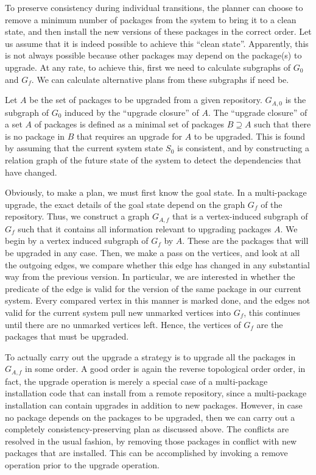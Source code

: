 \documentclass[a4paper,11pt]{article}
\begin{document}
To preserve consistency during individual transitions, the planner can
choose to remove a minimum number of packages from the system to bring
it to a clean state, and then install the new versions of these
packages in the correct order. Let us assume that it is indeed
possible to achieve this ``clean state''. Apparently, this is not
always possible because other packages may depend on the package(s) to
upgrade. At any rate, to achieve this, first we need to
calculate subgraphs of $G_0$ and $G_f$. We can calculate alternative
plans from these subgraphs if need be.

Let $A$ be the set of packages to be upgraded from a given repository.
$G_{A,0}$ is the subgraph of $G_{0}$ induced by the ``upgrade
closure'' of $A$. The ``upgrade closure'' of a set $A$ of packages is
defined as a minimal set of packages $B \supseteq A$ such that there is no
package in $B$ that requires an upgrade for $A$ to be upgraded. This
is found by assuming that the current system state $S_0$ is
consistent, and by constructing a relation graph of the future state
of the system to detect the dependencies that have changed.

Obviously, to make a plan, we must first know the goal state. In a
multi-package upgrade, the exact details of the goal state depend on
the graph $G_f$ of the repository. Thus, we construct a graph
$G_{A,f}$ that is a vertex-induced subgraph of $G_f$ such that it
contains all information relevant to upgrading packages $A$. We begin
by a vertex induced subgraph of $G_f$ by $A$. These are the packages
that will be upgraded in any case. Then, we make a pass on the
vertices, and look at all the outgoing edges, we compare whether this
edge has changed in any substantial way from the previous version. In
particular, we are interested in whether the predicate of the edge is
valid for the version of the same package in our current system. Every
compared vertex in this manner is marked done, and the edges not valid
for the current system pull new unmarked vertices into $G_f$, this
continues until there are no unmarked vertices left. Hence, the
vertices of $G_f$ are the packages that must be upgraded.

To actually carry out the upgrade a strategy is to upgrade all the
packages in $G_{A,f}$ in some order. A good order is again the reverse
topological order order, in fact, the upgrade operation is merely a
special case of a multi-package installation code that can install
from a remote repository, since a multi-package installation can
contain upgrades in addition to new packages. However, in case no
package depends on the packages to be upgraded, then we can carry out
a completely consistency-preserving plan as discussed above. The
conflicts are resolved in the usual fashion, by removing those
packages in conflict with new packages that are installed. This can be
accomplished by invoking a remove operation prior to the upgrade
operation.
\end{document}
